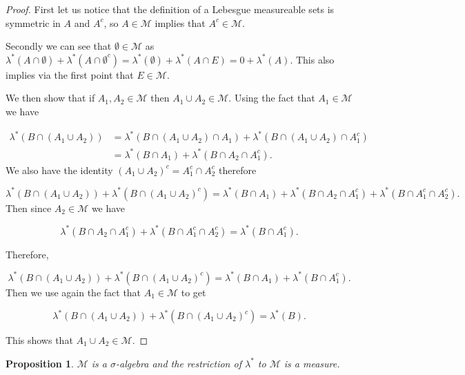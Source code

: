 \documentclass[
]{book}
\newtheorem{proposition}{Proposition}[chapter]
\theoremstyle{definition}
\theoremstyle{definition}
\theoremstyle{definition}
\theoremstyle{definition}
\theoremstyle{remark}
\begin{document}
\begin{proof}
First let us notice that the definition of a Lebesgue measureable sets is symmetric in \(A\) and \(A^c\), so \(A \in \mathscr{M}\) implies that \(A^c \in \mathscr{M}\).

Secondly we can see that \(\emptyset \in \mathscr{M}\) as \(\lambda^*(A\cap \emptyset) + \lambda^*(A \cap \emptyset^c) = \lambda^*(\emptyset) + \lambda^*(A \cap E) = 0+ \lambda^*(A)\). This also implies via the first point that \(E \in \mathscr{M}\).

We then show that if \(A_1, A_2 \in \mathscr{M}\) then \(A_1 \cup A_2 \in \mathscr{M}\). Using the fact that \(A_1 \in \mathscr{M}\) we have

\begin{align*} \lambda^*(B \cap (A_1 \cup A_2)) &= \lambda^*(B \cap (A_1 \cup A_2) \cap A_1) + \lambda^*(B \cap(A_1 \cup A_2) \cap A_1^c)\\
&= \lambda^* (B \cap A_1)  + \lambda^* (B \cap A_2 \cap A_1^c).  
\end{align*}
We also have the identity \((A_1 \cup A_2)^c = A_1^c \cap A_2^c\) therefore

\[ \lambda^*(B \cap (A_1 \cup A_2)) + \lambda^*(B \cap (A_1 \cup A_2)^c) = \lambda^*(B \cap A_1) + \lambda^* (B \cap A_2 \cap A_1^c) + \lambda^*(B \cap A_1^c \cap A_2^c). \]
Then since \(A_2 \in \mathscr{M}\) we have

\[  \lambda^* (B \cap A_2 \cap A_1^c) + \lambda^*(B \cap A_1^c \cap A_2^c) = \lambda^*(B \cap A_1^c).\]

Therefore,

\[  \lambda^*(B \cap (A_1 \cup A_2)) + \lambda^*(B \cap (A_1 \cup A_2)^c) = \lambda^*(B \cap A_1) + \lambda^*(B \cap A_1^c). \]
Then we use again the fact that \(A_1 \in \mathscr{M}\) to get

\[  \lambda^*(B \cap (A_1 \cup A_2)) + \lambda^*(B \cap (A_1 \cup A_2)^c) =\lambda^*(B). \]

This shows that \(A_1 \cup A_2 \in \mathscr{M}\).
\end{proof}

\begin{proposition}
\(\mathscr{M}\) is a \(\sigma\)-algebra and the restriction of \(\lambda^*\) to \(\mathscr{M}\) is a measure.
\end{proposition}
\end{document}
